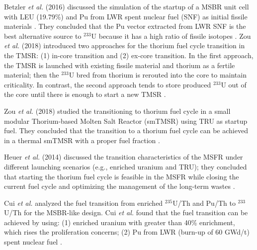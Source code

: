 Betzler \emph{et al.} (2016) discussed the simulation of the startup of a \gls{MSBR} unit
cell with \gls{LEU} (19.79\%) and Pu from \gls{LWR} spent nuclear fuel (SNF) as initial
fissile materials \cite{betzler2016modeling}. They concluded that the 
Pu vector extracted from LWR SNF is the best alternative source to 
$^{233}$U because it has a high ratio of fissile isotopes
\cite{betzler2016modeling}. Zou \emph{et al.} (2018) introduced two approaches for
the thorium fuel cycle transition in the \gls{TMSR}: (1) in-core transition and 
(2) ex-core transition. In the first approach, the TMSR is launched with 
existing fissile material and thorium as a fertile material; then the 
$^{233}$U bred from thorium is rerouted into the core to maintain criticality. 
In contrast, the second approach tends to store produced $^{233}$U out of the 
core until there is enough to start a new TMSR \cite{zou2018transition}.

Zou \emph{et al.} (2018) studied the transitioning to thorium fuel
cycle in a small modular Thorium-based Molten Salt Reactor (smTMSR) using \gls{TRU}
as startup fuel. They concluded that the transition to a thorium fuel cycle can
be achieved in a thermal smTMSR with a proper fuel fraction 
\cite{zou2018preliminary}.

Heuer \emph{et al.} (2014) discussed the transition characteristics of the \gls{MSFR}
under different launching scenarios (e.g., enriched uranium and TRU); they concluded that starting the thorium fuel cycle is feasible in the MSFR while closing the current fuel cycle and optimizing the management of the long-term wastes \cite{heuer2014towards}.

Cui \emph{et al.} analyzed the fuel transition from enriched $^{235}$U/Th and Pu/Th to $^{233}$U/Th for the MSBR-like design. Cui \emph{et al.} found that the fuel transition can be achieved by using: (1) enriched uranium with greater than 40\% enrichment, which rises the proliferation concerns; (2) Pu from LWR (burn-up of 60 GWd/t) spent nuclear fuel \cite{cui2017transition,cui2018possible}.

